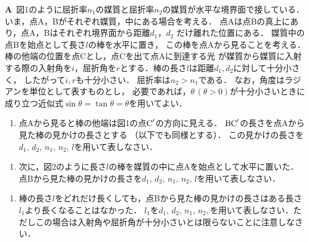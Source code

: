 \setcounter{figure}{0}
\noindent\textsf{\bfseries A}\ 
図1のように屈折率$n_1$の媒質と屈折率$n_2$の媒質が水平な境界面で接している．
いま，点A，Bがそれぞれ媒質\ajRoman{1}，中にある場合を考える．
点Aは点Bの真上にあり，点A，Bはそれぞれ境界面から距離$d_1$，$d_2$ だけ離れた位置にある．
媒質\ajRoman{2}中の点Bを始点として長さ$l$の棒を水平に置き， 
この棒を点Aから見ることを考える．
棒の他端の位置を点Cとし，点Cを出て点Aに到達する光
が媒質から媒質に入射する際の入射角を$i$，屈折角を$r$とする．棒の長さ$l$は距離$d_1,d_2$に対して十分小さく，
したがって$i,r$も十分小さい．
屈折率は$n_2>n_1$である．
なお，角度はラジアンを単位として表すものとし，
必要であれば，$\theta\,(\theta>0)$が十分小さいときに成り立つ近似式$\sin\theta=\tan\theta=\theta$を用いてよい．



\begin{enumerate}[（1）]
  \setlength{\leftskip}{-1zw}
  \setlength{\itemindent}{1zw}\setlength{\labelsep}{0.5zw}
  \setlength{\labelwidth}{1zw}\setlength{\leftmargin}{1zw}
  \setlength{\itemsep}{0.5\baselineskip}
  \item 点Aから見ると棒の他端は図1の点$\textup{C}^\prime$の方向に見える．
  $\textup{B}\textup{C}^\prime$の長さを点Aから見た棒の見かけの長さとする
  （以下でも同様とする）．
  この見かけの長さを$d_1,\,d_2,\,n_1,\,n_2,\,l$を用いて表しなさい．
\end{enumerate}


\begin{enumerate}[（1）]
  \setlength{\leftskip}{-1zw}
  \setlength{\itemindent}{1zw}\setlength{\labelsep}{0.5zw}
  \setlength{\labelwidth}{1zw}\setlength{\leftmargin}{1zw}
  \setlength{\itemsep}{0.5\baselineskip}
  \addtocounter{enumi}{1}
  \item 次に，図2のように長さ$l$の棒を媒質の中に点Aを始点として水平に置いた．点Bから見た棒の見かけの長さを$d_1,\,d_2,\,n_1,\,n_2,\,l$を用いて表しなさい．
\end{enumerate}


\begin{enumerate}[（1）]
  \setlength{\leftskip}{-1zw}
  \setlength{\itemindent}{1zw}\setlength{\labelsep}{0.5zw}
  \setlength{\labelwidth}{1zw}\setlength{\leftmargin}{1zw}
  \setlength{\itemsep}{0.5\baselineskip}
  \addtocounter{enumi}{2}
  \item 棒の長さ$l$をどれだけ長くしても，点Bから見た棒の見かけの長さはある長さ$l_1$より長くなることはなかった．
$l_1$を$d_1,\,d_2,\,n_1,\,n_2,$を用いて表しなさい．ただしこの場合は入射角や屈折角が十分小さいとは限らないことに注意しなさい．
\end{enumerate}



